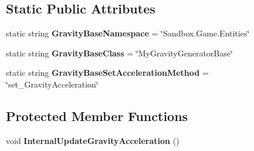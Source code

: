 \subsection*{Static Public Attributes}
\begin{DoxyCompactItemize}
\item 
\hypertarget{class_s_e_mod_a_p_i_internal_1_1_a_p_i_1_1_entity_1_1_sector_1_1_sector_object_1_1_cube_grid_1_19775a6da854269d8b1b6a1ac0a29f275_a76abbe5d0dc2027671e0c7399f389be2}{}static string {\bfseries Gravity\+Base\+Namespace} = \char`\"{}Sandbox.\+Game.\+Entities\char`\"{}\label{class_s_e_mod_a_p_i_internal_1_1_a_p_i_1_1_entity_1_1_sector_1_1_sector_object_1_1_cube_grid_1_19775a6da854269d8b1b6a1ac0a29f275_a76abbe5d0dc2027671e0c7399f389be2}

\item 
\hypertarget{class_s_e_mod_a_p_i_internal_1_1_a_p_i_1_1_entity_1_1_sector_1_1_sector_object_1_1_cube_grid_1_19775a6da854269d8b1b6a1ac0a29f275_a14d2c67f0ab6d58231f872d9f77e356e}{}static string {\bfseries Gravity\+Base\+Class} = \char`\"{}My\+Gravity\+Generator\+Base\char`\"{}\label{class_s_e_mod_a_p_i_internal_1_1_a_p_i_1_1_entity_1_1_sector_1_1_sector_object_1_1_cube_grid_1_19775a6da854269d8b1b6a1ac0a29f275_a14d2c67f0ab6d58231f872d9f77e356e}

\item 
\hypertarget{class_s_e_mod_a_p_i_internal_1_1_a_p_i_1_1_entity_1_1_sector_1_1_sector_object_1_1_cube_grid_1_19775a6da854269d8b1b6a1ac0a29f275_a76960cb4017e138deab680af8d4def49}{}static string {\bfseries Gravity\+Base\+Set\+Acceleration\+Method} = \char`\"{}set\+\_\+\+Gravity\+Acceleration\char`\"{}\label{class_s_e_mod_a_p_i_internal_1_1_a_p_i_1_1_entity_1_1_sector_1_1_sector_object_1_1_cube_grid_1_19775a6da854269d8b1b6a1ac0a29f275_a76960cb4017e138deab680af8d4def49}

\end{DoxyCompactItemize}
\subsection*{Protected Member Functions}
\begin{DoxyCompactItemize}
\item 
\hypertarget{class_s_e_mod_a_p_i_internal_1_1_a_p_i_1_1_entity_1_1_sector_1_1_sector_object_1_1_cube_grid_1_19775a6da854269d8b1b6a1ac0a29f275_aa99119abbeb33bc162c3d6c071937b5c}{}void {\bfseries Internal\+Update\+Gravity\+Acceleration} ()\label{class_s_e_mod_a_p_i_internal_1_1_a_p_i_1_1_entity_1_1_sector_1_1_sector_object_1_1_cube_grid_1_19775a6da854269d8b1b6a1ac0a29f275_aa99119abbeb33bc162c3d6c071937b5c}

\end{DoxyCompactItemize}
